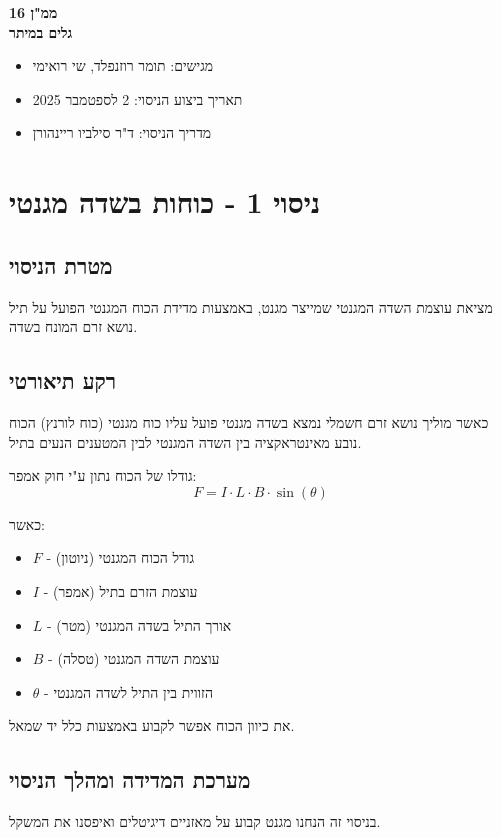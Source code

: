 \documentclass[14pt]{extarticle}
\begin{document}
\begin{center}
    {\LARGE \textbf{ממ"ן 16}}\\
    {\textbf{גלים במיתר}}
\end{center}

\begin{itemize}
    \item מגישים: תומר רוזנפלד, שי רואימי
    \item תאריך ביצוע הניסוי: 2 לספטמבר 2025
    \item מדריך הניסוי: ד"ר סילביו ריינהורן
\end{itemize}
\newpage
\section*{ניסוי 1 - כוחות בשדה מגנטי}
\subsection*{מטרת הניסוי}
מציאת עוצמת השדה המגנטי שמייצר מגנט, באמצעות מדידת הכוח המגנטי הפועל על תיל נושא זרם המונח בשדה.
\subsection*{רקע תיאורטי}
כאשר מוליך נושא זרם חשמלי נמצא בשדה מגנטי פועל עליו כוח מגנטי (כוח לורנץ)
הכוח נובע מאינטראקציה בין השדה המגנטי לבין המטענים הנעים בתיל.

גודלו של הכוח נתון ע"י חוק אמפר:
\begin{equation}
    F = I \cdot L \cdot B \cdot \sin(\theta)
\end{equation}

כאשר:
\begin{itemize}
    \item $F$ - גודל הכוח המגנטי (ניוטון)
    \item $I$ - עוצמת הזרם בתיל (אמפר)
    \item $L$ - אורך התיל בשדה המגנטי (מטר)
    \item $B$ - עוצמת השדה המגנטי (טסלה)
    \item $\theta$ - הזווית בין התיל לשדה המגנטי
\end{itemize}

את כיוון הכוח אפשר לקבוע באמצעות כלל יד שמאל.

\subsection*{מערכת המדידה ומהלך הניסוי}
בניסוי זה הנחנו מגנט קבוע על מאזניים דיגיטלים ואיפסנו את המשקל.
\end{document}
